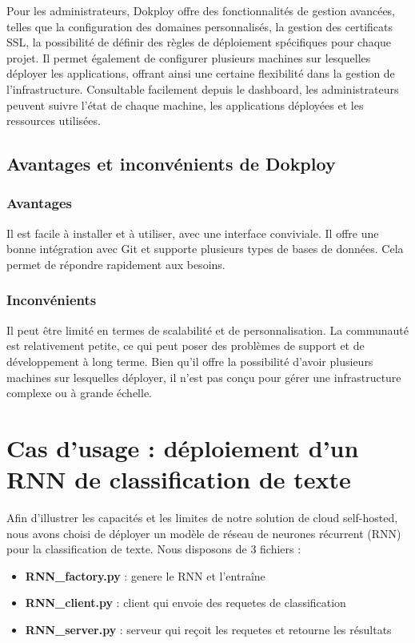 \documentclass{rapportClass} %
\begin{document}
Pour les administrateurs, Dokploy offre des fonctionnalités de gestion avancées, telles que la configuration des domaines
personnalisés, la gestion des certificats SSL, la possibilité de définir des règles de déploiement spécifiques pour chaque projet.
Il permet également de configurer plusieurs machines sur lesquelles déployer les applications, offrant ainsi une certaine 
flexibilité dans la gestion de l'infrastructure. Consultable facilement depuis le dashboard, les administrateurs peuvent 
suivre l'état de chaque machine, les applications déployées et les ressources utilisées.

\subsection{Avantages et inconvénients de Dokploy}
\subsubsection{Avantages}
Il est facile à installer et à utiliser, avec une interface conviviale. Il offre une bonne intégration avec Git et supporte plusieurs types de bases de données.
Cela permet de répondre rapidement aux besoins.
\subsubsection{Inconvénients}
Il peut être limité en termes de scalabilité et de personnalisation. La communauté est relativement petite, ce qui peut poser des problèmes de support et de développement à long terme.
Bien qu'il offre la possibilité d'avoir plusieurs machines sur lesquelles déployer, il n'est pas conçu pour gérer une infrastructure complexe ou à grande échelle.

\section{Cas d'usage : déploiement d'un RNN de classification de texte}
Afin d'illustrer les capacités et les limites de notre solution de cloud self-hosted, nous avons choisi de déployer un
modèle de réseau de neurones récurrent (RNN) pour la classification de texte.
Nous disposons de 3 fichiers :
\begin{itemize}
\item \textbf{RNN\_factory.py} : genere le RNN et l'entraîne
\item \textbf{RNN\_client.py} : client qui envoie des requetes de classification
\item \textbf{RNN\_server.py} : serveur qui reçoit les requetes et retourne les résultats
\end{itemize}
\end{document}

